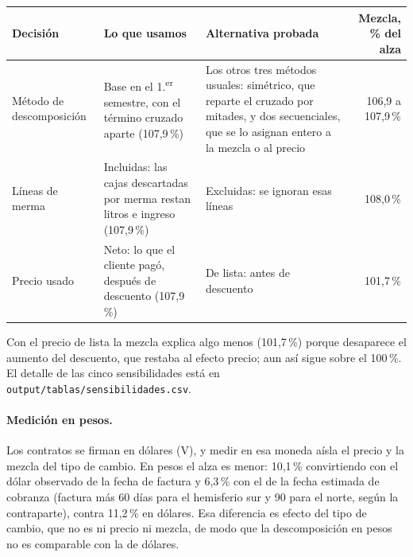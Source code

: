 \begin{center}
\small
\begin{tabular}{p{2.6cm} p{4.3cm} p{4.3cm} r}
\hline
\textbf{Decisión} & \textbf{Lo que usamos} & \textbf{Alternativa probada} & \textbf{Mezcla, \% del alza} \\
\hline
Método de descomposición & Base en el 1.\textsuperscript{er} semestre, con el término cruzado aparte (107,9\,\%) & Los otros tres métodos usuales: simétrico, que reparte el cruzado por mitades, y dos secuenciales, que se lo asignan entero a la mezcla o al precio & 106,9 a 107,9\,\% \\[2pt]
Líneas de merma & Incluidas: las cajas descartadas por merma restan litros e ingreso (107,9\,\%) & Excluidas: se ignoran esas líneas & 108,0\,\% \\[2pt]
Precio usado & Neto: lo que el cliente pagó, después de descuento (107,9\,\%) & De lista: antes de descuento & 101,7\,\% \\
\hline
\end{tabular}
\end{center}

\noindent Con el precio de lista la mezcla explica algo menos (101,7\,\%) porque desaparece el aumento del descuento, que restaba al efecto precio; aun así sigue sobre el 100\,\%. El detalle de las cinco sensibilidades está en \texttt{output/tablas/sensibilidades.csv}.

\paragraph{Medición en pesos.} Los contratos se firman en dólares (V), y medir en esa moneda aísla el precio y la mezcla del tipo de cambio. En pesos el alza es menor: 10,1\,\% convirtiendo con el dólar observado de la fecha de factura y 6,3\,\% con el de la fecha estimada de cobranza (factura más 60 días para el hemisferio sur y 90 para el norte, según la contraparte), contra 11,2\,\% en dólares. Esa diferencia es efecto del tipo de cambio, que no es ni precio ni mezcla, de modo que la descomposición en pesos no es comparable con la de dólares.
